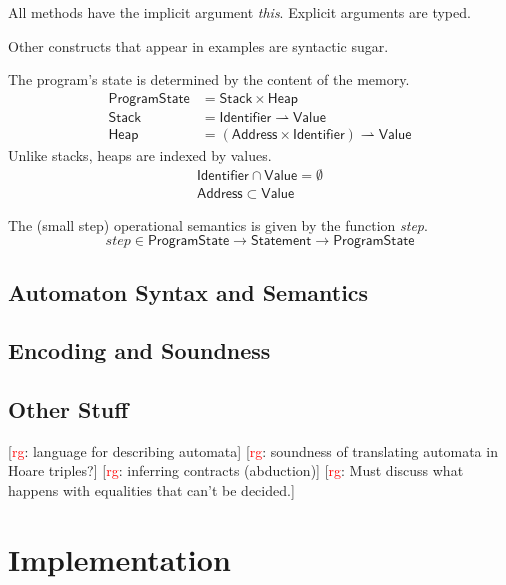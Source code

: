 \documentclass[a4paper]{article}
\newcommand{\todo}[2]{{\small [\textcolor{red}{#1}: #2]}}
\newcommand{\rg}[1]{\todo{rg}{#1}}
\newcommand{\pmap}{\rightharpoonup}
\theoremstyle{remark}
\begin{document}
\noindent All methods have the implicit argument \textit{this}.
Explicit arguments are typed.


\noindent Other constructs that appear in examples are syntactic sugar.

The program's state is determined by the content of the memory.
\begin{align}
\mathsf{ProgramState}&=\mathsf{Stack}\times\mathsf{Heap} \\
\mathsf{Stack}&=\mathsf{Identifier}\pmap\mathsf{Value} \\
\mathsf{Heap}&=(\mathsf{Address}\times\mathsf{Identifier})\pmap\mathsf{Value}
\end{align}
Unlike stacks, heaps are indexed by values.
\begin{gather}
\mathsf{Identifier}\cap\mathsf{Value}=\emptyset \\
\mathsf{Address}\subset\mathsf{Value}
\end{gather}

The (small step) operational semantics is given by the function \textit{step}.
\begin{equation}
\mathit{step}\in \mathsf{ProgramState}\to \mathsf{Statement} \to \mathsf{ProgramState}
\end{equation}

\subsection{Automaton Syntax and Semantics} %

\subsection{Encoding and Soundness} %

\subsection{Other Stuff} %

\rg{language for describing automata}
\rg{soundness of translating automata in Hoare triples?}
\rg{inferring contracts (abduction)}
\rg{Must discuss what happens with equalities that can't be decided.}

\section{Implementation} %
\end{document}
